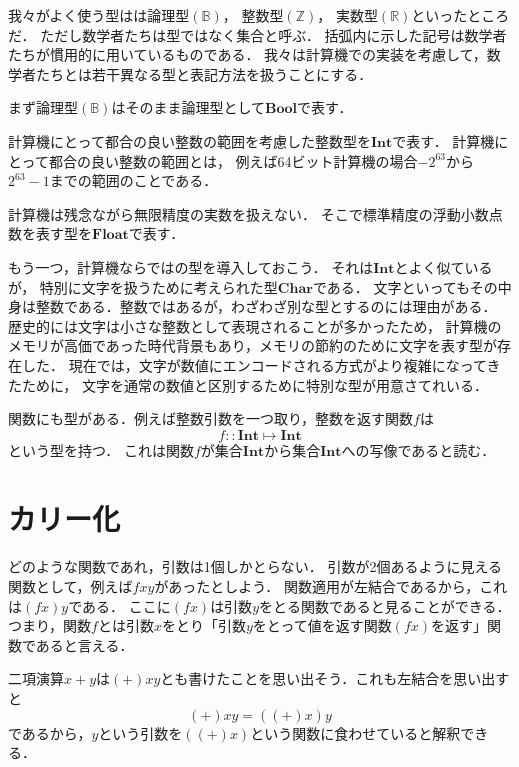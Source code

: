 \documentclass[a5paper,draft]{jsbook}
\newcommand{\mathSpecialSet}[1]{\mathbb{#1}} %
\newcommand{\mathTypeName}[1]{\mathbf{#1}}
\newcommand{\mathIn}{\mathrel{::}}
\newcommand{\mathMapsTo}{\mapsto}
\newcommand{\mathMorph}[2]{#1\mathMapsTo#2}
\begin{document}
我々がよく使う型はは論理型$(\mathSpecialSet{B})$，
整数型$(\mathSpecialSet{Z})$，
実数型$(\mathSpecialSet{R})$といったところだ．
ただし数学者たちは型ではなく集合と呼ぶ．
括弧内に示した記号は数学者たちが慣用的に用いているものである．
我々は計算機での実装を考慮して，数学者たちとは若干異なる型と表記方法を扱うことにする．

まず論理型$(\mathSpecialSet{B})$はそのまま論理型として$\mathTypeName{Bool}$で表す．

計算機にとって都合の良い整数の範囲を考慮した整数型を$\mathTypeName{Int}$で表す．
計算機にとって都合の良い整数の範囲とは，
例えば64ビット計算機の場合$-2^{63}$から$2^{63}-1$までの範囲のことである．

計算機は残念ながら無限精度の実数を扱えない．
そこで標準精度の浮動小数点数を表す型を$\mathTypeName{Float}$で表す．

もう一つ，計算機ならではの型を導入しておこう．
それは$\mathTypeName{Int}$とよく似ているが，
特別に文字を扱うために考えられた型$\mathTypeName{Char}$である．
文字といってもその中身は整数である．整数ではあるが，わざわざ別な型とするのには理由がある．
歴史的には文字は小さな整数として表現されることが多かったため，
計算機のメモリが高価であった時代背景もあり，メモリの節約のために文字を表す型が存在した．
現在では，文字が数値にエンコードされる方式がより複雑になってきたために，
文字を通常の数値と区別するために特別な型が用意さてれいる．

関数にも型がある．例えば整数引数を一つ取り，整数を返す関数$f$は
\begin{equation}
f\mathIn\mathMorph{\mathTypeName{Int}}{\mathTypeName{Int}}
\end{equation}
という型を持つ．
これは関数$f$が集合$\mathTypeName{Int}$から集合$\mathTypeName{Int}$への写像であると読む．

\section{カリー化}

どのような関数であれ，引数は1個しかとらない．
引数が2個あるように見える関数として，例えば$fxy$があったとしよう．
関数適用が左結合であるから，これは$\left(fx\right)y$である．
ここに$\left(fx\right)$は引数$y$をとる関数であると見ることができる．
つまり，関数$f$とは引数$x$をとり「引数$y$をとって値を返す関数$\left(fx\right)$を返す」関数であると言える．

二項演算$x+y$は$(+)xy$とも書けたことを思い出そう．これも左結合を思い出すと
\begin{equation}
(+)xy=\left((+)x\right)y
\end{equation}
であるから，$y$という引数を$\left((+)x\right)$という関数に食わせていると解釈できる．
\end{document}
